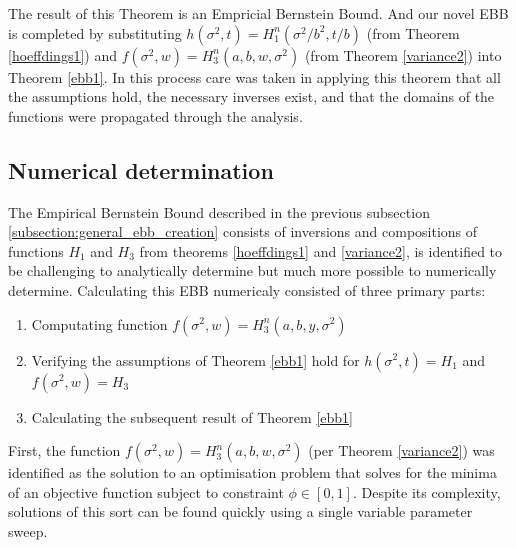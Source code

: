 The result of this Theorem is an Empricial Bernstein Bound. And our novel EBB is completed by substituting  $h(\sigma^2,t)=H_1^n\left(\sigma^2/b^2,t/b\right)$ (from Theorem \ref{hoeffdings1}) and $f(\sigma^2,w)=H_3^n\left(a,b,w,\sigma^2\right)$ (from Theorem \ref{variance2}) into Theorem \ref{ebb1}.
In this process care was taken in applying this theorem that all the assumptions hold, the necessary inverses exist, and that the domains of the functions were propagated through the analysis.




\subsection{Numerical determination}\label{numerical-implementation}

The Empirical Bernstein Bound described in the previous subsection \ref{subsection:general_ebb_creation} consists of inversions and compositions of functions $H_1$ and $H_3$ from theorems \ref{hoeffdings1} and \ref{variance2}, is identified to be challenging to analytically determine but much more possible to numerically determine.
Calculating this EBB numericaly consisted of three primary parts:
\begin{enumerate}
\item  Computating function $f(\sigma^2,w)=H_3^n(a,b,y,\sigma^2)$
\item  Verifying the assumptions of Theorem \ref{ebb1} hold for $h(\sigma^2,t)=H_1$ and $f(\sigma^2,w)=H_3$
\item  Calculating the subsequent result of Theorem \ref{ebb1}
\end{enumerate}

First, the function $f(\sigma^2,w)=H_3^n(a,b,w,\sigma^2)$ (per Theorem \ref{variance2}) was identified as the solution to an optimisation problem that solves for the minima of an objective function subject to constraint $\phi\in[0,1]$.
Despite its complexity, solutions of this sort can be found quickly using a single variable parameter sweep.

